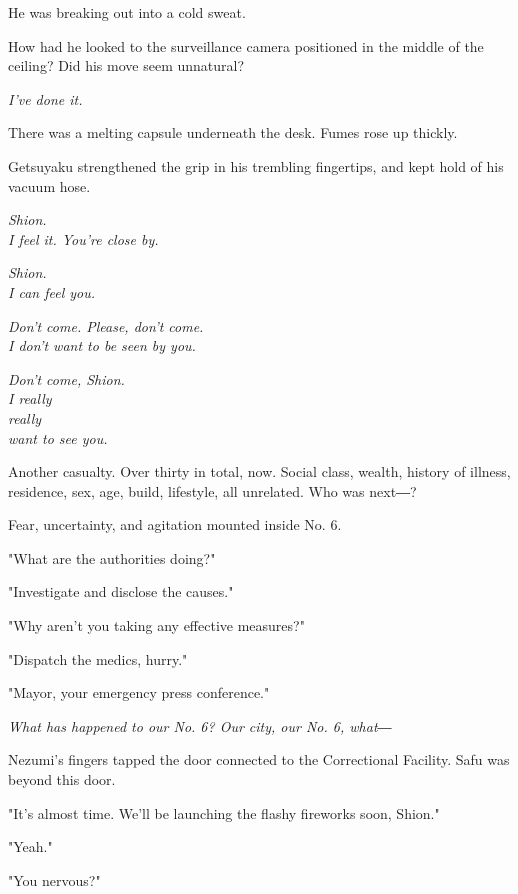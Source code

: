 He was breaking out into a cold sweat.

How had he looked to the surveillance camera positioned in the middle of
the ceiling? Did his move seem unnatural?

\emph{I've done it.}

There was a melting capsule underneath the desk. Fumes rose up thickly.

Getsuyaku strengthened the grip in his trembling fingertips, and kept
hold of his vacuum hose.

\myspace

\emph{Shion.\\
	I feel it. You're close by.}

\myspace

\emph{Shion.\\
	I can feel you.}

\myspace

\emph{Don't come. Please, don't come.\\
	I don't want to be seen by you.}

\myspace

\emph{Don't come, Shion.\\
	I really\\
	really\\
	want to see you.}

\myspace

Another casualty. Over thirty in total, now. Social class, wealth,
history of illness, residence, sex, age, build, lifestyle, all
unrelated. Who was next―?

Fear, uncertainty, and agitation mounted inside No. 6.

"What are the authorities doing?"

"Investigate and disclose the causes."

"Why aren't you taking any effective measures?"

"Dispatch the medics, hurry."

"Mayor, your emergency press conference."

\emph{What has happened to our No. 6? Our city, our No. 6, what―}

\myspace

Nezumi's fingers tapped the door connected to the Correctional Facility.
Safu was beyond this door.

"It's almost time. We'll be launching the flashy fireworks soon, Shion."

"Yeah."

"You nervous?"

